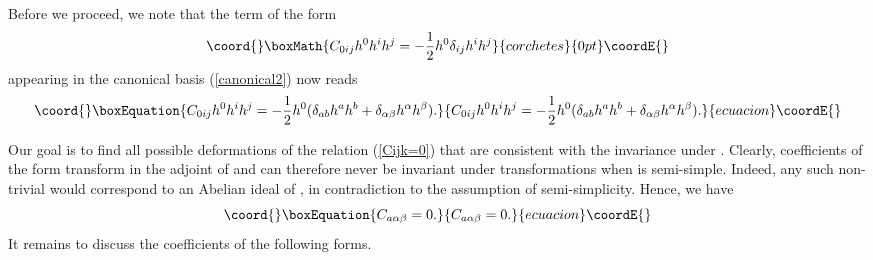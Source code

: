 \documentclass[a4paper,11pt]{article}
\begin{document}
Before we proceed, we note that the term of the form
\begin{displaymath}\coord{}\boxMath{
C_{0ij}h^{0}h^{i}h^{j}=-\frac{1}{2} h^{0}\delta_{ij}h^{i}h^{j}
}{corchetes}{0pt}\coordE{}\end{displaymath}
appearing in the canonical basis (\ref{canonical2}) now
reads
\begin{equation}\coord{}\boxEquation{\label{deltaij}
C_{0ij}h^{0}h^{i}h^{j}=-\frac{1}{2}h^{0}(\delta_{ab}h^{a}h^{b}
+\delta_{\alpha\beta}h^{\alpha}h^{\beta}).
}{C_{0ij}h^{0}h^{i}h^{j}=-\frac{1}{2}h^{0}(\delta_{ab}h^{a}h^{b}
+\delta_{\alpha\beta}h^{\alpha}h^{\beta}).
}{ecuacion}\coordE{}\end{equation}

Our goal is to find all possible deformations of the relation
\coordHE{} (\ref{Cijk=0}) that are consistent with the
invariance under \coordHE{}. Clearly, coefficients of the form
\coordHE{} transform in the adjoint of \coordHE{} and can
therefore never be invariant under \coordHE{} transformations when \coordHE{} is
semi-simple. Indeed, any such non-trivial \coordHE{} would
correspond to an Abelian ideal of \coordHE{}, in contradiction to the assumption
of semi-simplicity. Hence, we have
\begin{equation}\coord{}\boxEquation{
C_{a\alpha\beta}=0.
}{
C_{a\alpha\beta}=0.
}{ecuacion}\coordE{}\end{equation}
It remains to discuss the coefficients of the following forms.
\end{document}
